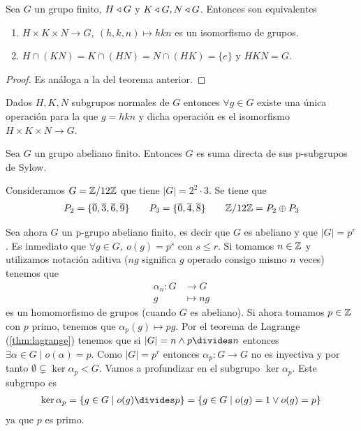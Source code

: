 \begin{cor}
	Sea $G$ un grupo finito, $H \mathbin{\triangleleft} G$ y $K \mathbin{\triangleleft} G, N \mathbin{\triangleleft} G$. Entonces son equivalentes
	\begin{enumerate}
		\item $H \times K \times N \to G,\ (h,k,n) \mapsto hkn$ es un isomorfismo de grupos.
		\item $H\cap (KN) = K \cap (HN) = N \cap (HK) = \{e\}$ y $HKN = G$.
	\end{enumerate}
\end{cor}

\begin{proof}
	Es análoga a la del teorema anterior.
\end{proof}

\begin{cor}
	Dados $H, K, N$ subgrupos normales de $G$ entonces $\forall g \in G$ existe una única operación para la que $g = hkn$ y dicha operación es el isomorfismo $H\times K \times N \to G$.
\end{cor}


\begin{thm}
	Sea $G$ un grupo abeliano finito. Entonces $G$ es suma directa de sus p-subgrupos de Sylow.
\end{thm}

\begin{ej}
	Consideramos $G = \mathbb{Z}/12\mathbb{Z}$ que tiene $|G| = 2^2\cdot 3$. Se tiene que
	\begin{align*}
		P_2 = \{\overline{0}, \overline{3}, \overline{6}, \overline{9}\}\qquad P_3 = \{\overline{0}, \overline{4}, \overline{8}\} \qquad \mathbb{Z}/12\mathbb{Z} = P_2 \oplus P_3
	\end{align*}
\end{ej}

Sea ahora $G$ un p-grupo abeliano finito, es decir que $G$ es abeliano y que $|G| = p^r$. Es inmediato que $\forall g \in G,\ o(g) = p^s$ con $s \leq r$. Si tomamos $n \in \mathbb{Z}$ y utilizamos notación aditiva ($ng$ significa $g$ operado consigo mismo $n$ veces) tenemos que
\begin{align*}
	\alpha_n : G &\to G \\
	g &\mapsto ng
\end{align*}
es un homomorfismo de grupos (cuando $G$ es abeliano). Si ahora tomamos $p \in \mathbb{Z}$ con $p$ primo, tenemos que $\alpha_p(g) \mapsto pg$. Por el teorema de Lagrange (\ref{thm:lagrange}) tenemos que si $|G| = n \land p \divides n$ entonces $\exists \alpha \in G \mid o(\alpha) = p$. Como $|G| = p^r$ entonces $\alpha_p:G \to G$ no es inyectiva y por tanto $\emptyset \subsetneq \ker \alpha_p < G$. Vamos a profundizar en el subgrupo $\ker \alpha_p$. Este subgrupo es
\begin{align*}
	\ker \alpha_p = \{g \in G \mid o(g) \divides p\} = \{g \in G \mid o(g) = 1 \lor o(g) = p\}
\end{align*}
ya que $p$ es primo.


